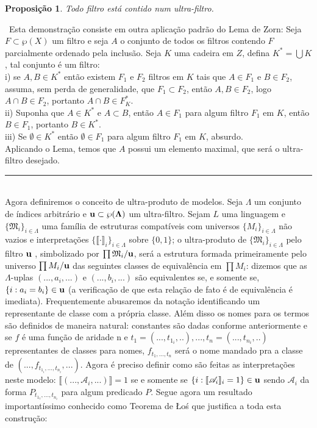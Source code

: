 \documentclass[11pt,a4paper]{article}
\newtheorem{prop}[mydef]{Proposição}
\def\dem{\par\smallbreak\noindent {\textit{ Demonstração:}} \ }
\def\eop{\hfill\rule{2.5mm}{2.5mm} \\ }
\theoremstyle{definition}
\begin{document}
\begin{prop}
	
	Todo filtro está contido num ultra-filtro. 
	
\end{prop}

\dem Esta demonstração consiste em outra aplicação padrão do Lema de Zorn: Seja $F\subset \wp (X)$ um filtro e seja $A$ o conjunto de todos os filtros contendo $F$ parcialmente ordenado pela inclusão. Seja $K$ uma cadeira em $Z$, defina $K^*=\bigcup K$, tal conjunto é um filtro: \\

i) se $A,B\in K^*$ então existem $F_1$ e $F_2$ filtros em $K$ tais que $A\in F_1$ e $B\in F_2$, assuma, sem perda de generalidade, que $F_1\subset F_2$, então $A,B\in F_2$, logo $A\cap B\in F_2$, portanto $A\cap B\in F_K^*$. \\

ii) Suponha que  $A\in K^*$ e $A\subset B$, então $A\in F_1$ para algum filtro $F_1$ em $K$, então $B\in F_1$, portanto $B\in K^*$. \\

iii) Se $\emptyset \in K^*$ então $\emptyset \in F_1$ para algum filtro $F_1$ em $K$, absurdo. \\

Aplicando o Lema, temos que $A$ possui um elemento maximal, que será o ultra-filtro desejado. \eop

Agora definiremos o conceito de ultra-produto de modelos. Seja $\Lambda$ um conjunto de índices arbitrário e $\bf{u}\subset \wp(\Lambda)$ um ultra-filtro. Sejam $L$ uma linguagem e $\{ \mathfrak{M}_i\}_{i\in \Lambda} $ uma família de estruturas compatíveis com universos $\{ M_i\}_{i\in \Lambda} $ não vazios e interpretações $\{ \llbracket \cdot \rrbracket_i \}_{i\in \Lambda} $ sobre $\{0,1\}$; o ultra-produto de $\{ \mathfrak{M}_i\}_{i\in \Lambda} $ pelo filtro $\bf{u}$ , simbolizado por $\prod\mathfrak{M}_i /\bf{u} $, será a estrutura formada primeiramente pelo universo $\prod M_i /\bf{u} $ das seguintes classes de equivalência em $\prod M_i $: dizemos que as $\Lambda$-uplas $(..., a_i , ...)$ e $(..., b_i , ...)$ são equivalentes se, e somente se, $\{i:a_i = b_i \}\in \bf{u}$ (a verificação de que esta relação de fato é de equivalência é imediata). Frequentemente abusaremos da notação identificando um representante de classe com a própria classe. Além disso os nomes para os termos são definidos de maneira natural: constantes são dadas conforme anteriormente e se $f$ é uma função de aridade n e $t_1=(..., t_{1_i},..),...,t_n=(..., t_{n_i},..)$ representantes de classes para nomes, $f_{t_1,...,t_n}$ será o nome mandado pra a classe de $(...,f_{t_{1_i},...,t_{n_i}},...)$. Agora é preciso definir como são feitas as interpretações neste modelo: $ \llbracket (... ,\mathscr{A}_i,...) \rrbracket=1$ se e somente se $\{i: \llbracket \mathscr{A}_i \rrbracket_i=1\}\in \bf{u}$ sendo $\mathscr{A}_i$ da forma $P_{t_{1_1},...,t_{n_i}}$ para algum predicado $P$.  Segue agora um resultado importantíssimo conhecido como Teorema de Łoś que justifica a toda esta construção:
\end{document}
